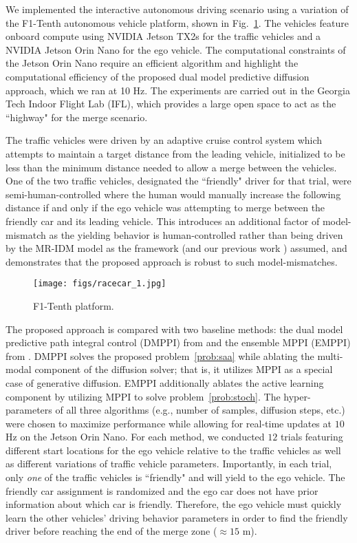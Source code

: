 \documentclass[letterpaper, 10 pt, conference]{IEEEconf}
\begin{document}
We implemented the interactive autonomous driving scenario using a variation of the F1-Tenth autonomous vehicle platform, shown in Fig.~\ref{fig:racecar}.
The vehicles feature onboard compute using NVIDIA Jetson TX2s for the traffic vehicles and a NVIDIA Jetson Orin Nano for the ego vehicle.
The computational constraints of the Jetson Orin Nano require an efficient algorithm and highlight the computational efficiency of the proposed dual model predictive diffusion approach, which we ran at 10 Hz.
The experiments are carried out in the Georgia Tech Indoor Flight Lab (IFL), which provides a large open space to act as the ``highway" for the merge scenario.

The traffic vehicles were driven by an adaptive cruise control system which attempts to maintain a target distance from the leading vehicle, initialized to be less than the minimum distance needed to allow a merge between the vehicles.
One of the two traffic vehicles, designated the ``friendly" driver for that trial, were semi-human-controlled where the human would manually increase the following distance if and only if the ego vehicle was attempting to merge between the friendly car and its leading vehicle.
This introduces an additional factor of model-mismatch as the yielding behavior is human-controlled rather than being driven by the MR-IDM model as the framework (and our previous work \cite{knaup2024active}) assumed, and demonstrates that the proposed approach is robust to such model-mismatches.
\begin{figure}[ht]
    \centering
    \texttt{[image: figs/racecar\_1.jpg]}
    \caption{F1-Tenth platform.}
    \label{fig:racecar}
\end{figure}

The proposed approach is compared with two baseline methods: the dual model predictive path integral control (DMPPI) from \cite{knaup2024active} and the ensemble MPPI (EMPPI) from \cite{abraham2020model}.
DMPPI solves the proposed problem~\eqref{prob:saa} while ablating the multi-modal component of the diffusion solver; that is, it utilizes MPPI as a special case of generative diffusion. %
EMPPI additionally ablates the active learning component by utilizing MPPI to solve problem~\eqref{prob:stoch}.
The hyper-parameters of all three algorithms (e.g., number of samples, diffusion steps, etc.) were chosen to maximize performance while allowing for real-time updates at $10$ Hz on the Jetson Orin Nano.
% 
For each method, we conducted $12$ trials featuring different start locations for the ego vehicle relative to the traffic vehicles as well as different variations of traffic vehicle parameters.
Importantly, in each trial, only \emph{one} of the traffic vehicles is ``friendly" and will yield to the ego vehicle. The friendly car assignment is randomized and the ego car does not have prior information about which car is friendly. 
Therefore, the ego vehicle must quickly learn the other vehicles' driving behavior parameters in order to find the friendly driver before reaching the end of the merge zone ($\approx 15$ m). 
\end{document}
